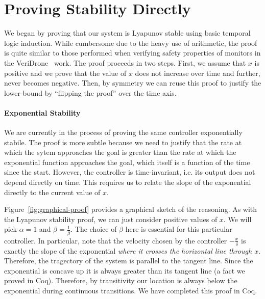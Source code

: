 \documentclass[preprint,nocopyrightspace]{sigplanconf}
\begin{document}

\section{Proving Stability Directly}
\label{sec:graphical}

We began by proving that our system is Lyapunov stable using basic temporal logic induction.
While cumbersome due to the heavy use of arithmetic, the proof is quite similar to those performed when verifying safety properties of monitors in the VeriDrone~\cite{ricketts2015veridrone} work.
The proof proceeds in two steps.
First, we assume that $x$ is positive and we prove that the value of $x$ does not increase over time and further, never becomes negative.
Then, by symmetry we can reuse this proof to justify the lower-bound by ``flipping the proof'' over the time axis.

\paragraph{Exponential Stability}
We are currently in the process of proving the same controller exponentially stabile.
The proof is more subtle because we need to justify that the rate at which the sytem approaches the goal is greater than the rate at which the exponential function approaches the goal, which itself is a function of the time since the start.
However, the controller is time-invariant, i.e. its output does not depend directly on time.
This requires us to relate the slope of the exponential directly to the current value of $x$.

Figure~\ref{fig:graphical-proof} provides a graphical sketch of the reasoning.
As with the Lyapunov stability proof, we can just consider positive values of $x$.
We will pick $\alpha = 1$ and $\beta = \frac{1}{\beta}$.
The choice of $\beta$ here is essential for this particular controller.
In particular, note that the velocity chosen by the controller $-\frac{x}{\delta}$ is exactly the slope of the exponential \emph{where it crosses the horizontal line through $x$}.
Therefore, the tragectory of the system is parallel to the tangent line.
Since the exponential is concave up it is always greater than its tangent line (a fact we proved in Coq).
Therefore, by transitivity our location is always below the exponential during continuous transitions.
We have completed this proof in Coq.
\end{document}
